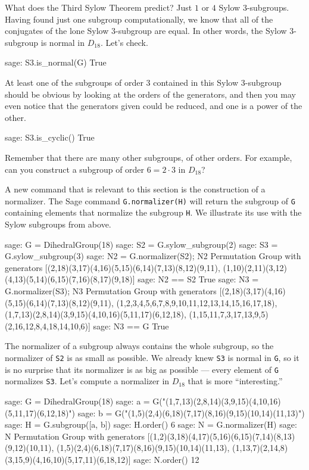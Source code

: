 %
What does the Third Sylow Theorem predict?  Just $1$ or $4$ Sylow $3$-subgroups.  Having found just one subgroup computationally, we know that all of the conjugates of the lone Sylow $3$-subgroup are equal.  In other words, the Sylow $3$-subgroup is normal in $D_{18}$.  Let's check.
%
\begin{sageexample}
sage: S3.is_normal(G)
True
\end{sageexample}
%
At least one of the subgroups of order $3$ contained in this Sylow $3$-subgroup should be obvious by looking at the orders of the generators, and then you may even notice that the generators given could be reduced, and one is a power of the other.
%
\begin{sageexample}
sage: S3.is_cyclic()
True
\end{sageexample}
%
Remember that there are many other subgroups, of other orders.  For example, can you construct a subgroup of order $6=2\cdot 3$ in $D_{18}$?\par
%
%
A new command that is relevant to this section is the construction of a normalizer.  The Sage command \verb?G.normalizer(H)? will return the subgroup of \verb?G? containing elements that normalize the subgroup \verb?H?.  We illustrate its use with the Sylow subgroups from above.
%
\begin{sageexample}
sage: G = DihedralGroup(18)
sage: S2 = G.sylow_subgroup(2)
sage: S3 = G.sylow_subgroup(3)
sage: N2 = G.normalizer(S2); N2
Permutation Group with generators
  [(2,18)(3,17)(4,16)(5,15)(6,14)(7,13)(8,12)(9,11),
   (1,10)(2,11)(3,12)(4,13)(5,14)(6,15)(7,16)(8,17)(9,18)]
sage: N2 == S2
True
sage: N3 = G.normalizer(S3); N3
Permutation Group with generators
[(2,18)(3,17)(4,16)(5,15)(6,14)(7,13)(8,12)(9,11),
 (1,2,3,4,5,6,7,8,9,10,11,12,13,14,15,16,17,18),
 (1,7,13)(2,8,14)(3,9,15)(4,10,16)(5,11,17)(6,12,18),
 (1,15,11,7,3,17,13,9,5)(2,16,12,8,4,18,14,10,6)]
sage: N3 == G
True
\end{sageexample}
%
The normalizer of a subgroup always contains the whole subgroup, so the normalizer of \verb?S2? is as small as possible.  We already knew \verb?S3? is normal in \verb?G?, so it is no surprise that its normalizer is as big as possible --- every element of \verb?G? normalizes \verb?S3?.  Let's compute a normalizer in $D_{18}$ that is more ``interesting.''
%
\begin{sageexample}
sage: G = DihedralGroup(18)
sage: a = G("(1,7,13)(2,8,14)(3,9,15)(4,10,16)(5,11,17)(6,12,18)")
sage: b = G("(1,5)(2,4)(6,18)(7,17)(8,16)(9,15)(10,14)(11,13)")
sage: H = G.subgroup([a, b])
sage: H.order()
6
sage: N = G.normalizer(H)
sage: N
Permutation Group with generators
  [(1,2)(3,18)(4,17)(5,16)(6,15)(7,14)(8,13)(9,12)(10,11),
   (1,5)(2,4)(6,18)(7,17)(8,16)(9,15)(10,14)(11,13),
   (1,13,7)(2,14,8)(3,15,9)(4,16,10)(5,17,11)(6,18,12)]
sage: N.order()
12
\end{sageexample}

